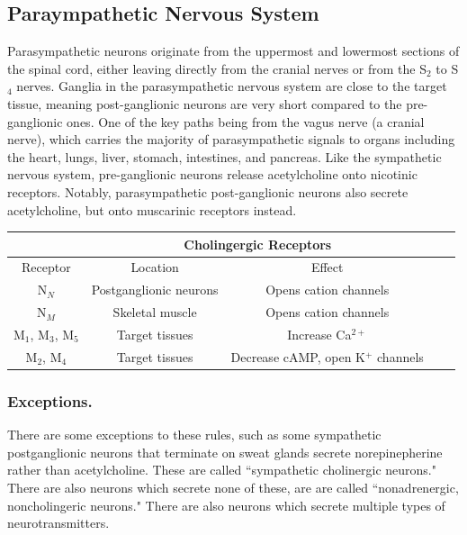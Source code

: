 \subsection{Paraympathetic Nervous System}
Parasympathetic neurons originate from the uppermost and lowermost sections of the spinal cord, either leaving directly from the cranial nerves or from the S$_2$ to S$_4$ nerves. Ganglia in the parasympathetic nervous system are close to the target tissue, meaning post-ganglionic neurons are very short compared to the pre-ganglionic ones. One of the key paths being from the vagus nerve (a cranial nerve), which carries the majority of parasympathetic signals to organs including the heart, lungs, liver, stomach, intestines, and pancreas. Like the sympathetic nervous system, pre-ganglionic neurons release acetylcholine onto nicotinic receptors. Notably, parasympathetic post-ganglionic neurons also secrete acetylcholine, but onto muscarinic receptors instead. 


\begin{table}[!htbp]
\centering
\begin{tabular}{*5c}
\toprule
{} &  \multicolumn{2}{c}{Cholingergic Receptors} & {}\\
\midrule
{Receptor}   & Location & Effect \\
\midrule
N$_N$  &  Postganglionic neurons & Opens cation channels   \\
N$_M$  &  Skeletal muscle  & Opens cation channels  \\
M$_1$, M$_3$, M$_5$   &  Target tissues   & Increase Ca$^{2+}$   \\
M$_2$, M$_4$   &  Target tissues   & Decrease cAMP, open K$^+$ channels   \\
\bottomrule
\end{tabular}
\end{table}


\subsubsection{Exceptions.}
There are some exceptions to these rules, such as some sympathetic postganglionic neurons that terminate on sweat glands secrete norepinepherine rather than acetylcholine. These are called ``sympathetic cholinergic neurons." There are also neurons which secrete none of these, are are called ``nonadrenergic, noncholingeric neurons." There are also neurons which secrete multiple types of neurotransmitters. 

